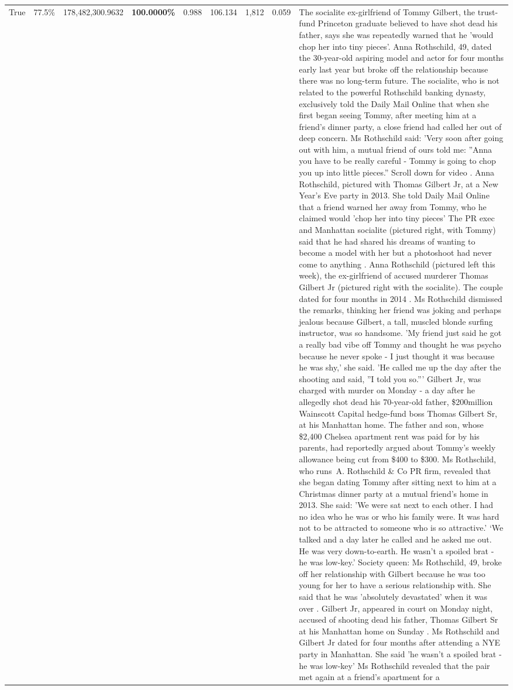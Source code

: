 \begin{table}[H]
\begin{tabular}{lllrlllll}
True & 77.5\% & 178,482,300.9632 & \bfseries \color{red} 100.0000\% & 0.988 & 106.134 & 1,812 & 0.059 & The socialite ex-girlfriend of Tommy Gilbert, the trust-fund Princeton graduate believed to have shot dead his father, says she was repeatedly warned that he 'would chop her into tiny pieces'. Anna Rothschild, 49, dated the 30-year-old aspiring model and actor for four months early last year but broke off the relationship because there was no long-term future. The socialite, who is not related to the powerful Rothschild banking dynasty, exclusively told the Daily Mail Online that when she first began seeing Tommy, after meeting him at a friend's dinner party, a close friend had called her out of deep concern. Ms Rothschild said: 'Very soon after going out with him, a mutual friend of ours told me: ''Anna you have to be really careful - Tommy is going to chop you up into little pieces.'' Scroll down for video . Anna Rothschild, pictured with Thomas Gilbert Jr, at a New Year's Eve party in 2013. She told Daily Mail Online that a friend warned her away from Tommy, who he claimed would 'chop her into tiny pieces' The PR exec and Manhattan socialite (pictured right, with Tommy) said that he had shared his dreams of wanting to become a model with her but a photoshoot had never come to anything . Anna Rothschild (pictured left this week), the ex-girlfriend of accused murderer Thomas Gilbert Jr (pictured right with the socialite). The couple dated for four months in 2014 . Ms Rothschild dismissed the remarks, thinking her friend was joking and perhaps jealous because Gilbert, a tall, muscled blonde surfing instructor, was so handsome. 'My friend just said he got a really bad vibe off Tommy and thought he was psycho because he never spoke - I just thought it was because he was shy,' she said. 'He called me up the day after the shooting and said, ''I told you so.''' Gilbert Jr, was charged with murder on Monday - a day after he allegedly shot dead his 70-year-old father, \$200million Wainscott Capital hedge-fund boss Thomas Gilbert Sr, at his Manhattan home. The father and son, whose \$2,400 Chelsea apartment rent was paid for by his parents, had reportedly argued about Tommy's weekly allowance being cut from \$400 to \$300. Ms Rothschild, who runs A. Rothschild \& Co PR firm, revealed that she began dating Tommy after sitting next to him at a Christmas dinner party at a mutual friend's home in 2013. She said: 'We were sat next to each other. I had no idea who he was or who his family were. It was hard not to be attracted to someone who is so attractive.' ‘We talked and a day later he called and he asked me out. He was very down-to-earth. He wasn’t a spoiled brat - he was low-key.’ Society queen: Ms Rothschild, 49, broke off her relationship with Gilbert because he was too young for her to have a serious relationship with. She said that he was 'absolutely devastated' when it was over . Gilbert Jr, appeared in court on Monday night, accused of shooting dead his father, Thomas Gilbert Sr at his Manhattan home on Sunday . Ms Rothschild and Gilbert Jr dated for four months after attending a NYE party in Manhattan. She said 'he wasn't a spoiled brat - he was low-key' Ms Rothschild revealed that the pair met again at a friend’s apartment for a 
\end{tabular}
\end{table}
